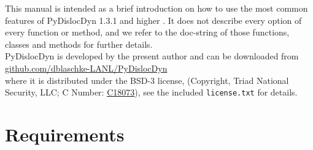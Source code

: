 \documentclass[11pt,letterpaper,oneside,pdftex]{article}
\begin{document}
\noindent
This manual is intended as a brief introduction on how to use the most common features of PyDislocDyn 1.3.1 and higher \cite{pydislocdyn}.
It does not describe every option of every function or method, and we refer to the doc-string of those functions, classes and methods for further details.
\\
PyDislocDyn is developed by the present author and can be downloaded from
\\\href{https://github.com/dblaschke-LANL/PyDislocDyn}{github.com/dblaschke-LANL/PyDislocDyn}\\
where it is distributed under the BSD-3 license, (Copyright, Triad National Security, LLC; C Number: \href{https://doi.org/10.11578/dc.20180619.15}{C18073}), see the included \verb|license.txt| for details.


\section{Requirements}
\end{document}
